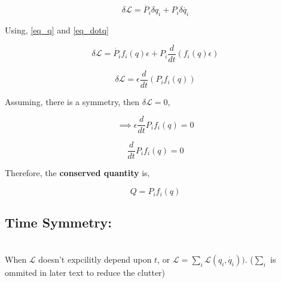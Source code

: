 \documentclass[a4paper]{article}
\newcommand{\Lagr}{\mathcal{L}}
\newcommand{\ddt}{\frac{d}{dt}}
\newcommand{\pdt}[2]{\frac{\partial #1}{\partial #2}}
\begin{document}
			\begin{equation}
				\delta \Lagr = \dot{P_i}\delta q_i + P_i \delta \dot{q_i} \label{eq_var_L}
			\end{equation}

			Using, \eqref{eq_q} and \eqref{eq_dotq}

			$$ \delta \Lagr = \dot{P_i} f_i(q) \epsilon + P_i \ddt(f_i(q)\epsilon) $$

			$$ \delta \Lagr = \epsilon \ddt(P_i f_i(q)) $$
			
			Assuming, there is a symmetry, then $\delta \Lagr = 0$,

			$$\implies \epsilon \ddt{P_i f_i(q)} = 0$$

			$$ \ddt{P_i f_i(q)} = 0 $$

			Therefore, the \textbf{conserved quantity} is,

			\begin{equation}
				Q = P_i f_i(q) \label{eq_conserved_Q}
			\end{equation}
		
		\subsection*{Time Symmetry: } \label{time_symmetry}
			\noindent \\









			When $\Lagr$ doesn't expcilitly depend upon $t$, or $\Lagr = \sum_i \Lagr(q_i, \dot{q_i}))$. ($\sum_i$ is ommited in later text to reduce the clutter)
\end{document}
